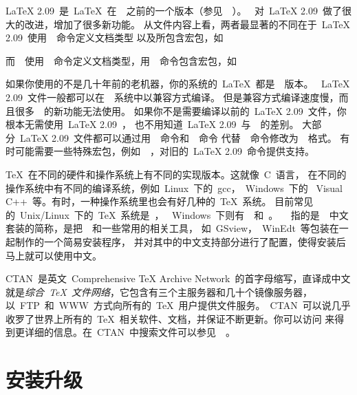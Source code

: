 \documentclass[a4paper]{article}
\begin{document}
\LaTeX{} 2.09~是~\LaTeX{}~在~\LaTeXe{}~之前的一个版本（参见~~）。
\LaTeXe{}~对~\LaTeX{} 2.09~做了很大的改进，增加了很多新功能。
从文件内容上看，两者最显著的不同在于~\LaTeX{} 2.09~使用~~命令定义文档类型
以及所包含宏包，如
\begin{code}
\end{code}
而~\LaTeXe{}~使用~~命令定义文档类型，用~~命令包含宏包，如
如果你使用的不是几十年前的老机器，你的系统的~\LaTeX{}~都是~\LaTeXe{}~版本。
~\LaTeX{} 2.09~文件一般都可以在~\LaTeXe{}~系统中以兼容方式编译。
但是兼容方式编译速度慢，而且很多~\LaTeXe{}~的新功能无法使用。
如果你不是需要编译以前的~\LaTeX{} 2.09~文件，你根本无需使用~\LaTeX{} 2.09~，
也不用知道~\LaTeX{} 2.09~与~\LaTeXe{}~的差别。
大部分~\LaTeX{} 2.09~文件都可以通过用~~命令和~~命令
代替~~命令修改为~\LaTeXe{}~格式。
有时可能需要一些特殊宏包，例如~~，对旧的~\LaTeX{} 2.09~命令提供支持。


\TeX{}~在不同的硬件和操作系统上有不同的实现版本。这就像~C~语言，
在不同的操作系统中有不同的编译系统，例如~Linux~下的~gcc，~Windows~下的
~Visual C++~等。有时，一种操作系统里也会有好几种的~\TeX{}~系统。
目前常见的~Unix/Linux~下的~\TeX{}~系统是~\teTeX{}，
~Windows~下则有~\MiKTeX{}~和~\fpTeX{}。
~\CTeX{}~指的是~\CTeX{}~中文套装的简称，是把~\MiKTeX{}~和一些常用的相关工具，
如~GSview，~WinEdt~等包装在一起制作的一个简易安装程序，
并对其中的中文支持部分进行了配置，使得安装后马上就可以使用中文。


CTAN~是英文~Comprehensive \TeX{} Archive Network~的首字母缩写，直译成中文
就是\emph{综合~\TeX{}~文件网络}，它包含有三个主服务器和几十个镜像服务器，
以~FTP~和~WWW~方式向所有的~\TeX{}~用户提供文件服务。~CTAN~可以说几乎
收罗了世界上所有的~\TeX{}~相关软件、文档，并保证不断更新。你可以访问
来得到更详细的信息。在~CTAN~中搜索文件可以参见~~。


\section{安装升级}
\end{document}
